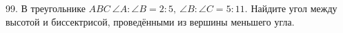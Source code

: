 99. В треугольнике $ABC\ \angle A: \angle B=2:5,\ \angle B: \angle C=5:11.$ Найдите угол между высотой и биссектрисой, проведёнными из вершины меньшего угла.\\

